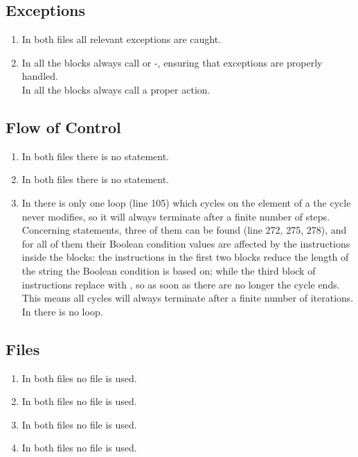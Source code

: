 \subsection{Exceptions}
\begin{enumerate}[NUM]
    \item In both files all relevant exceptions are caught.\\
    
    \item  In  all the  blocks always call  or -, ensuring that exceptions are properly handled.\\
    In  all the  blocks always call a proper action.
\end{enumerate}

\subsection{Flow of Control}
\begin{enumerate}[NUM]
    \item In both files there is no  statement.
    
    \item In both files there is no  statement.
    
    \item In  there is only one  loop (line 105) which cycles on the element of a  the cycle never modifies, so it will always terminate after a finite number of steps. Concerning  statements, three of them can be found (line 272, 275, 278), and for all of them their Boolean condition values are affected by the instructions inside the  blocks: the instructions in the first two blocks reduce the length of the string the Boolean condition is based on; while the third block of instructions replace \code{-}\code{-} with \code{-}, so as soon as there are no longer \code{-}\code{-} the cycle ends. This means all cycles will always terminate after a finite number of iterations.\\
    In  there is no loop.
\end{enumerate}

\subsection{Files}
\begin{enumerate}[NUM]
    \item In both files no file is used.
    
    \item In both files no file is used.
    
    \item In both files no file is used.
    
    \item In both files no file is used.
\end{enumerate}